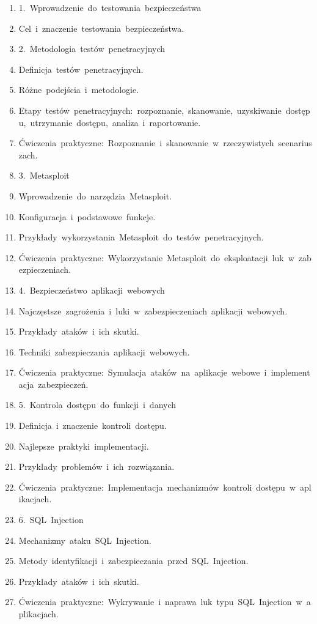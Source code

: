 \documentclass[12pt, a4paper]{article}
\begin{document}
\begin{enumerate}
  \item 1. Wprowadzenie do testowania bezpieczeństwa
  \item Cel i znaczenie testowania bezpieczeństwa.
  \item 2. Metodologia testów penetracyjnych
  \item Definicja testów penetracyjnych.
  \item Różne podejścia i metodologie.
  \item Etapy testów penetracyjnych: rozpoznanie, skanowanie, uzyskiwanie dostępu, utrzymanie dostępu, analiza i raportowanie.
  \item Ćwiczenia praktyczne: Rozpoznanie i skanowanie w rzeczywistych scenariuszach.
  \item 3. Metasploit
  \item Wprowadzenie do narzędzia Metasploit.
  \item Konfiguracja i podstawowe funkcje.
  \item Przykłady wykorzystania Metasploit do testów penetracyjnych.
  \item Ćwiczenia praktyczne: Wykorzystanie Metasploit do eksploatacji luk w zabezpieczeniach.
  \item 4. Bezpieczeństwo aplikacji webowych
  \item Najczęstsze zagrożenia i luki w zabezpieczeniach aplikacji webowych.
  \item Przykłady ataków i ich skutki.
  \item Techniki zabezpieczania aplikacji webowych.
  \item Ćwiczenia praktyczne: Symulacja ataków na aplikacje webowe i implementacja zabezpieczeń.
  \item 5. Kontrola dostępu do funkcji i danych
  \item Definicja i znaczenie kontroli dostępu.
  \item Najlepsze praktyki implementacji.
  \item Przykłady problemów i ich rozwiązania.
  \item Ćwiczenia praktyczne: Implementacja mechanizmów kontroli dostępu w aplikacjach.
  \item 6. SQL Injection
  \item Mechanizmy ataku SQL Injection.
  \item Metody identyfikacji i zabezpieczania przed SQL Injection.
  \item Przykłady ataków i ich skutki.
  \item Ćwiczenia praktyczne: Wykrywanie i naprawa luk typu SQL Injection w aplikacjach.

\end{enumerate}
\end{document}
